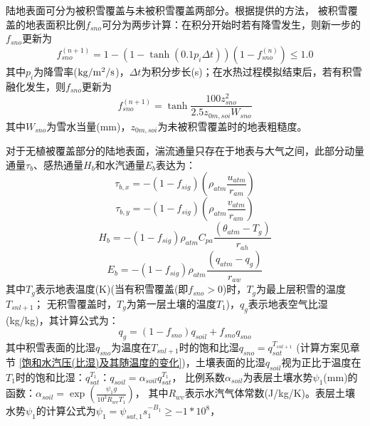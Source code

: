陆地表面可分为被积雪覆盖与未被积雪覆盖两部分。根据\citet{swenson2012new}提供的方法，
被积雪覆盖的地表面积比例$f_{sno}$可分为两步计算：在积分开始时若有降雪发生，则新一步的$f_{sno}$更新为
\begin{equation}
f_{{sno }}^{(n+1)}=1-\left(1-\tanh \left(0.1 p_{i} \Delta t\right)\right)\left(1-f_{{sno }}^{(n)}\right) \leq 1.0
\end{equation}
其中$p_i$为降雪率($\rm kg/m^2/s$)，$\Delta t$为积分步长(s)；在水热过程模拟结束后，若有积雪融化发生，则$f_{sno}$更新为
\begin{equation}
f_{sno}^{(n+1)}=\tanh \frac{100 z_{s n o}^{2}}{2.5 z_{0 m, s o i} W_{sno}}
\end{equation}
其中$W_{sno}$为雪水当量(mm)，$z_{0m,soi}$为未被积雪覆盖时的地表粗糙度。

对于无植被覆盖部分的陆地表面，湍流通量只存在于地表与大气之间，此部分动量通量$\tau_b$、感热通量$H_b$和水汽通量$E_b$表达为：
\begin{equation}\label{taub_x}
\tau_{b, x}=-\left(1-f_{sig}\right)\left(\rho_{atm} \frac{u_{atm}}{r_{a m}}\right)
\end{equation}
\begin{equation}\label{taub_y}
\tau_{b, y}=-\left(1-f_{sig}\right)\left(\rho_{atm} \frac{v_{atm}}{r_{a m}}\right)
\end{equation}
\begin{equation}\label{Hb}
H_{b}=-\left(1-f_{sig}\right) \rho_{atm} C_{p a} \frac{\left(\theta_{atm}-T_{g}\right)}{r_{a h}}
\end{equation}
\begin{equation}\label{Eb}
E_{b}=-\left(1-f_{sig}\right) \rho_{atm} \frac{\left(q_{atm}-q_{g}\right)}{r_{a w}}
\end{equation}
其中$T_g$表示地表温度(K)(当有积雪覆盖(即$f_{sno}>0$)时，$T_g$为最上层积雪的温度$T_{snl+1}$；
无积雪覆盖时，$T_g$为第一层土壤的温度$T_1$)，$q_g$表示地表空气比湿(kg/kg)，其计算公式为：
\begin{equation}
q_{g}=\left(1-f_{{sno }}\right) q_{{soil }}+f_{{sno }} q_{{sno }}
\end{equation}
其中积雪表面的比湿$q_{sno}$为温度在$T_{snl+1}$时的饱和比湿$q_{sno}=q_{sat}^{T_{snl+1}}$
(计算方案见章节 \ref{饱和水汽压(比湿)及其随温度的变化})，土壤表面的比湿$q_{soil}$视为正比于温度在$T_1$时的饱和比湿：$q_{sat}^{T_1}：q_{soil}=\alpha_{soil}q_{sat}^{T_1}$，
比例系数$\alpha_{soil}$为表层土壤水势$\psi_1$(mm)的函数\citep{philip1957theory}：$\alpha_{soil}=\exp \left(\frac{\psi_1g}{{10}^3R_{wv}T_1}\right)$，
其中$R_{wv}$表示水汽气体常数(J/kg/K)。表层土壤水势$\psi_1$的计算公式为$\psi_1=\psi_{sat,1}s_1^{-B_1}\geq-1\ast{10}^8$，
